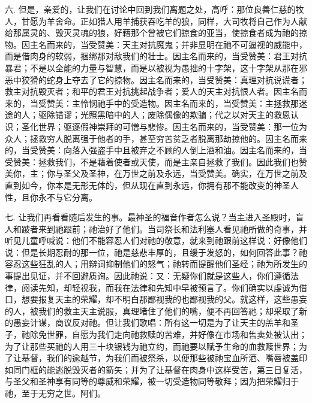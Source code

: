 六. 但是，亲爱的，让我们在讨论中回到我们离题之处，高呼：那位良善仁慈的牧人，甘愿为羊舍命。正如猎人用羊捕获吞吃羊的狼，同样，大司牧将自己作为人献给那属灵的、毁灭灵魂的狼，好藉那个曾被它们掠食的亚当，使掠食者成为祂的掠物。因主名而来的，当受赞美：天主对抗魔鬼；并非显明在祂不可逼视的威能中，而是借肉身的软弱，捆绑那对敌我们的壮士。因主名而来的，当受赞美：君王对抗暴君；不是以全能的力量与智慧，而是以被视为愚拙的十字架，这十字架从那在邪恶中狡猾的蛇身上夺去了它的掠物。因主名而来的，当受赞美：真理对抗说谎者；救主对抗毁灭者；和平的君王对抗挑起战争者；爱人的天主对抗恨人者。因主名而来的，当受赞美：主怜悯祂手中的受造物。因主名而来的，当受赞美：主拯救那迷途的人；驱除错谬；光照黑暗中的人；废除偶像的欺骗；代之以对天主的救恩认识；圣化世界；驱逐假神崇拜的可憎与悲惨。因主名而来的，当受赞美：那一位为众人；拯救穷人脱离强于他者的手，甚至穷苦贫乏者脱离那劫掠他的。因主名而来的，当受赞美：向落入强盗手中且被弃之不顾的人倒上酒和油。因主名而来的，当受赞美：拯救我们，不是藉着使者或天使，而是主亲自拯救了我们。因此我们也赞美你，主；你与圣父及圣神，在万世之前及永远，当受赞美。确实，在万世之前及直到如今，你本是无形无体的，但从现在直到永远，你拥有那不能改变的神圣人性，且你永不与它分离。\par

七. 让我们再看看随后发生的事。最神圣的福音作者怎么说？当主进入圣殿时，盲人和跛者来到祂跟前；祂治好了他们。当司祭长和法利塞人看见祂所做的奇事，并听见儿童呼喊说：他们不能容忍人们对祂的敬意，就来到祂跟前这样说：好像他们说：但是长期忍耐的那一位，祂是慈悲丰厚的，且缓于发怒的，如何回答此事？祂容忍这些狂乱的人；用辩词抑制他们的怒气；祂转而提醒他们圣经；祂为所发生的事提出见证，并不回避质询。因此祂说：又：无疑你们就是这些人，你们遵循法律，阅读先知，却轻视我，而我在法律和先知中早被预言了。你们确实以虔诚为借口，想要报复天主的荣耀，却不明白那鄙视我的也鄙视我的父。就这样，这些愚妄的人，被我们的救主天主说服，真理堵住了他们的嘴，便不再回答祂；却采取了新的愚妄计谋，商议反对祂。但让我们歌唱：所有这一切是为了让天主的羔羊和圣子，祂除免世罪，自愿为我们走向祂救赎的苦难，并好像在市场和售卖处被认出；为了让那些买祂的人用三十块银钱为祂立约，而祂要以赋予生命的血救赎世界；为了让基督，我们的逾越节，为我们而被祭杀，以便那些被祂宝血所洒、嘴唇被盖印如同门框的能逃脱毁灭者的箭矢；并为了让基督在肉身中这样受苦，第三日复活，与圣父和圣神享有同等的尊威和荣耀，被一切受造物同等敬拜；因为把荣耀归于祂，至于无穷之世。阿们。\par

